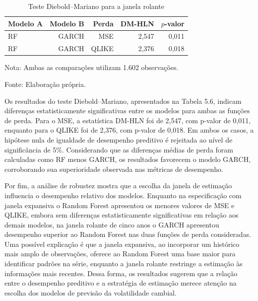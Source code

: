 \begin{table}[!htbp]
    \centering
    \caption{Teste Diebold–Mariano para a janela rolante}
    \label{tab:dm_rolante}
    \begin{tabular}{lrrrr}
        \toprule
        Modelo A & Modelo B & Perda & DM-HLN & $p$-valor \\
        \midrule
        RF & GARCH & MSE   & 2,547 & 0,011 \\
        RF & GARCH & QLIKE & 2,376 & 0,018 \\
        \bottomrule
    \end{tabular}
    \begin{center}
        \footnotesize Nota: Ambas as comparações utilizam 1.602 observações.

        \footnotesize Fonte: Elaboração própria.
    \end{center}
\end{table}

Os resultados do teste Diebold–Mariano, apresentados na Tabela 5.6, indicam diferenças estatisticamente significativas entre os modelos para ambas as 
funções de perda. Para o MSE, a estatística DM-HLN foi de 2,547, com p-valor de 0,011, enquanto para o QLIKE foi de 2,376, com p-valor de 0,018. Em 
ambos os casos, a hipótese nula de igualdade de desempenho preditivo é rejeitada ao nível de significância de 5\%. Considerando que as diferenças médias 
de perda foram calculadas como RF menos GARCH, os resultados favorecem o modelo GARCH, corroborando sua superioridade observada nas métricas de desempenho.

Por fim, a análise de robustez mostra que a escolha da janela de estimação influencia o desempenho relativo dos modelos. Enquanto na especificação com janela 
expansiva o Random Forest apresentou os menores valores de MSE e QLIKE, embora sem diferenças estatisticamente significativas em relação aos demais modelos, 
na janela rolante de cinco anos o GARCH apresentou desempenho superior ao Random Forest nas duas funções de perda consideradas. Uma possível explicação é que 
a janela expansiva, ao incorporar um histórico mais amplo de observações, oferece ao Random Forest uma base maior para identificar padrões na série, enquanto 
a janela rolante restringe a estimação às informações mais recentes. Dessa forma, os resultados sugerem que a relação entre o desempenho preditivo e a estratégia 
de estimação merece atenção na escolha dos modelos de previsão da volatilidade cambial.